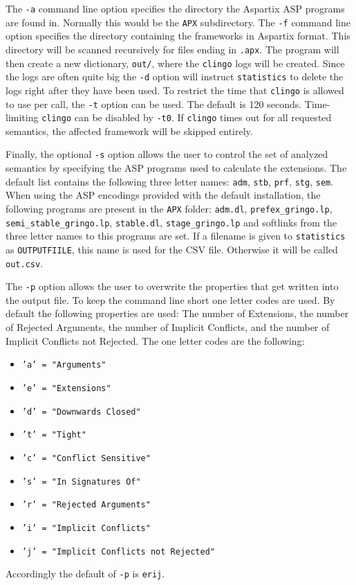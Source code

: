 \documentclass[parskip=half]{scrartcl}
\begin{document}
The \texttt{-a} command line option specifies the directory the Aspartix ASP
programs are found in. Normally this would be the \texttt{APX\/} subdirectory.
The \texttt{-f} command line
option specifies the directory containing the frameworks in Aspartix format.
This directory will be scanned recursively for files ending
in \texttt{.apx}. The program will then create a new
dictionary, \texttt{out/}, where the \texttt{clingo} logs will be created.
Since the logs are often quite big the \texttt{-d} option will instruct
\texttt{statistics} to delete the logs right after they have been used.
To restrict the time that \texttt{clingo} is allowed to use per call, the
\texttt{-t} option can be used. The default is 120 seconds. Time-limiting
\texttt{clingo} can be disabled by \texttt{-t0}.
If \texttt{clingo} times out for all requested semantics, the affected
framework will be skipped entirely.

Finally, the optional \texttt{-s} option allows the user to control the
set of analyzed semantics by specifying the ASP programs used to calculate the extensions.
The default list contains the following three letter names:
\texttt{adm}, \texttt{stb}, \texttt{prf}, \texttt{stg}, \texttt{sem}.
When using the ASP encodings provided with the default installation,
the following programs are present in the \texttt{APX\/} folder: \texttt{adm.dl},
\texttt{prefex\_gringo.lp}, \texttt{semi\_stable\_gringo.lp},
\texttt{stable.dl}, \texttt{stage\_gringo.lp} and softlinks from the three letter
names to this programs are set.
If a filename is given to \texttt{statistics} as \texttt{OUTPUTFIILE}, this name is used for the CSV file.
Otherwise it will be called \texttt{out.csv}.

The \texttt{-p} option allows the user to overwrite the properties that
get written into the output file. To keep the command line short one
letter codes are used.
By default the following properties are used: The number
of Extensions, the number of Rejected Arguments, the number of Implicit
Conflicts, and the number of Implicit Conflicts not Rejected.
The one letter codes are the following:
\begin{itemize}
	\item \texttt{'a' = "Arguments"}
	\item \texttt{'e' = "Extensions"}
	\item \texttt{'d' = "Downwards Closed"}
	\item \texttt{'t' = "Tight"}
	\item \texttt{'c' = "Conflict Sensitive"}
	\item \texttt{'s' = "In Signatures Of"}
	\item \texttt{'r' = "Rejected Arguments"}
	\item \texttt{'i' = "Implicit Conflicts"}
	\item \texttt{'j' = "Implicit Conflicts not Rejected"}
\end{itemize}
Accordingly the default of \texttt{-p} is \texttt{erij}.
\end{document}
